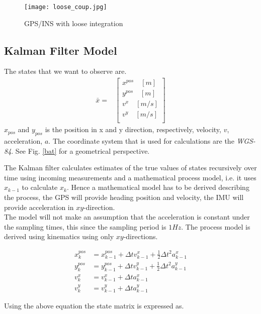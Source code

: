\begin{figure}[H]
\centering
\texttt{[image: loose\_coup.jpg]}
\caption{GPS/INS with loose integration}
\label{kalman_system}
\end{figure}

\subsection*{Kalman Filter Model}
The states that we want to observe are.
\begin{align}
\bar{x}=&
\begin{bmatrix}
x^{pos}\quad[m]\\
y^{pos}\quad[m]\\
v^{x}\quad[m/s]\\
v^{y}\quad[m/s]\\
\end{bmatrix}
\end{align}
$x_{pos}$ and $y_{pos}$ is the position in x and y direction, respectively, velocity, $v$, acceleration, $a$. The coordinate system that is used for calculations are the \emph{WGS-84}. See Fig. \ref{bat} for a geometrical perspective.

The Kalman filter calculates estimates of the true values of states recursively over time using incoming measurements and a mathematical process model, i.e. it uses $x_{k-1}$ to calculate $x_k$. Hence a mathematical model has to be derived describing the process, the GPS will provide heading position and velocity, the IMU will provide acceleration in $xy$-direction.\\
The model will not make an assumption that the acceleration is constant under the sampling times, this since the sampling period is $1Hz$. The process model is derived using kinematics using only $xy$-directions.
	
\begin{align}
x^{pos}_{k}&=x^{pos}_{k-1}+\Delta tv^{x}_{k-1}+\frac{1}{2}\Delta t^2a^x_{k-1}\\
y^{pos}_{k}&=y^{pos}_{k-1}+\Delta tv^{y}_{k-1}+\frac{1}{2}\Delta t^2a^y_{k-1}\\
v^{x}_{k}&=v^{x}_{k-1}+\Delta ta^x_{k-1}\\
v^{y}_{k}&=v^{y}_{k-1}+\Delta ta^y_{k-1}
\end{align}

Using the above equation the state matrix is expressed as.

